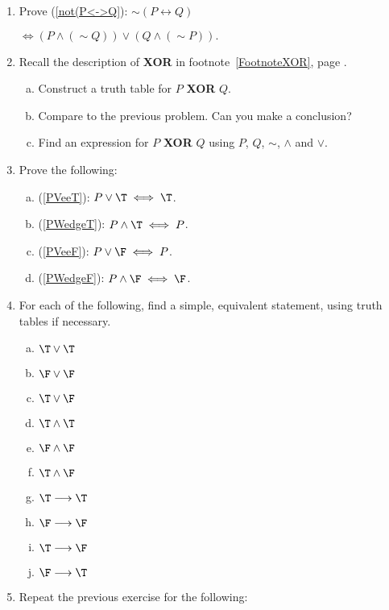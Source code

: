 \begin{multicols}{2}
\begin{enumerate}
\item Prove (\ref{not(P<->Q}):
$
\sim(P\longleftrightarrow Q)$

$\iff
(P\wedge(\sim Q))\vee(Q\wedge(\sim P)).
$

\item Recall the description of {\bf XOR} in 
      footnote~\ref{FootnoteXOR}, page \pageref{FootnoteXOR}.
  \begin{enumerate}[(a)] 
  \item Construct a truth table for \newline $P$ {\bf XOR} $Q$.
  \item Compare to the previous problem.
        Can you make a conclusion?
  \item Find an expression for $P$ {\bf XOR} $Q$ using $P$, $Q$,
        $\sim$, $\wedge$ and $\vee$.
  \end{enumerate}
\item Prove the following:
  \begin{enumerate}[(a)]
  \item (\ref{PVeeT}): $P\vee\T\iff \T$.
  \item (\ref{PWedgeT}): $P\wedge\T\iff P$.
  \item (\ref{PVeeF}): $P\vee\F\iff P$.
  \item (\ref{PWedgeF}): $P\wedge\F\iff\F$. 
  \end{enumerate}
\item For each of the following, find a simple, equivalent statement,
      using truth tables if necessary.
  \begin{multicols}{2}
  \begin{enumerate}[(a)]
  \item $\T\vee\T$
  \item $\F\vee\F$
  \item $\T\vee\F$
  \item $\T\wedge\T$
  \item $\F\wedge\F$
  \item $\T\wedge\F$
  \item $\T\longrightarrow\T$
  \item $\F\longrightarrow\F$
  \item $\T\longrightarrow\F$
  \item $\F\longrightarrow\T$
  \end{enumerate}\end{multicols}
\item Repeat the previous exercise for the following:
  \begin{multicols}{2}

\end{multicols}
\end{enumerate}
\end{multicols}
